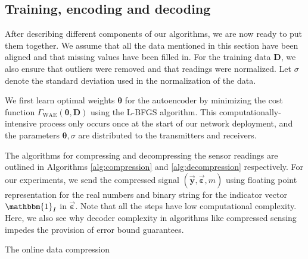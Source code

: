 \documentclass[a4paper,onecolumn,conference]{IEEEtran}
\begin{document}
\subsection{Training, encoding and decoding}
After describing different components of our algorithms, we are now ready to put them together. We assume that all the data mentioned in this section have been aligned and that missing values have been filled in. For the training data $\mathbf{D}$, we also ensure that outliers were removed and that readings were normalized. Let $\sigma$ denote the standard deviation used in the normalization of the data.

We first learn optimal weights $\boldsymbol{\theta}$ for the autoencoder by minimizing the cost function $\Gamma_{\text{WAE}}(\boldsymbol{\theta},\mathbf{D})$ using the L-BFGS algorithm. This computationally-intensive process only occurs once at the start of our network deployment, and the parameters $\boldsymbol{\theta}, \sigma$ are distributed to the transmitters and receivers.

The algorithms for compressing and decompressing the sensor readings are outlined in Algorithms \ref{alg:compression} and \ref{alg:decompression} respectively. For our experiments, we send the compressed signal $(\vec{\mathbf{y}},\vec{\boldsymbol{\varepsilon}},m)$ using floating point representation for the real numbers and binary string for the indicator vector $\mathbbm{1}_{I}$ in $\vec{\boldsymbol{\varepsilon}}$. Note that all the steps have low computational complexity. Here, we also see why decoder complexity in algorithms like compressed sensing impedes the provision of error bound guarantees.

\begin{algorithm}
	\DontPrintSemicolon
\caption{The online data compression \label{alg:compression}}
\end{algorithm}
\end{document}
